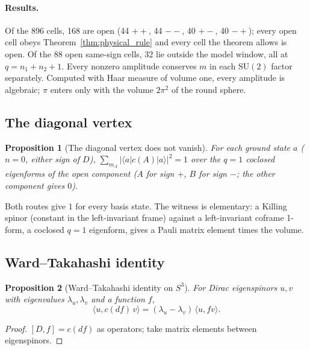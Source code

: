 \documentclass[11pt]{article}
\newtheorem{proposition}{Proposition}
\begin{document}
\paragraph{Results.}  Of the 896 cells, 168 are open (44 $++$, 44 $--$,
40 $+-$, 40 $-+$); every open cell obeys Theorem~\ref{thm:physical_rule}
and every cell the theorem allows is open.  Of the 88 open same-sign
cells, 32 lie outside the model window, all at $q = n_1 + n_2 + 1$.
Every nonzero amplitude conserves $m$ in each $\mathrm{SU}(2)$ factor
separately.  Computed with Haar measure of volume one, every amplitude is
algebraic; $\pi$ enters only with the volume $2\pi^2$ of the round
sphere.

\subsection{The diagonal vertex}

\begin{proposition}[The diagonal vertex does not vanish]
\label{prop:diagonal}
For each ground state $a$ ($n = 0$, either sign of $D$),
$\sum_{m_A} |\langle a | c(A) | a \rangle|^2 = 1$ over the $q = 1$
coclosed eigenforms of the open component ($A$ for sign $+$, $B$ for
sign $-$; the other component gives $0$).
\end{proposition}

Both routes give $1$ for every basis state.  The witness is elementary:
a Killing spinor (constant in the left-invariant frame) against a
left-invariant coframe 1-form, a coclosed $q = 1$ eigenform, gives a
Pauli matrix element times the volume.

\subsection{Ward--Takahashi identity}

\begin{proposition}[Ward--Takahashi identity on $S^3$]
\label{prop:ward}
For Dirac eigenspinors $u, v$ with eigenvalues $\lambda_u, \lambda_v$ and
a function $f$,
\begin{equation}
  \langle u, c(df)\,v \rangle = (\lambda_u - \lambda_v)\,\langle u, f v\rangle .
  \label{eq:ward}
\end{equation}
\end{proposition}

\begin{proof}
$[D, f] = c(df)$ as operators; take matrix elements between
eigenspinors.
\end{proof}
\end{document}
